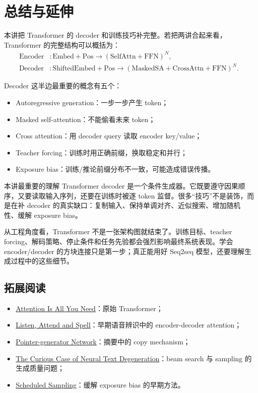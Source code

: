 \documentclass[a4paper]{article}
\begin{document}
\section{总结与延伸}

本讲把 Transformer 的 decoder 和训练技巧补完整。若把两讲合起来看，Transformer 的完整结构可以概括为：
\[
\begin{aligned}
    \text{Encoder}
    &: \mathrm{Embed+Pos}
    \rightarrow
    (\mathrm{SelfAttn+FFN})^{N},\\
    \text{Decoder}
    &: \mathrm{ShiftedEmbed+Pos}
    \rightarrow
    (\mathrm{MaskedSA+CrossAttn+FFN})^{N}.
\end{aligned}
\]

Decoder 这半边最重要的概念有五个：
\begin{itemize}
    \item Autoregressive generation：一步一步产生 token；
    \item Masked self-attention：不能偷看未来 token；
    \item Cross attention：用 decoder query 读取 encoder key/value；
    \item Teacher forcing：训练时用正确前缀，换取稳定和并行；
    \item Exposure bias：训练/推论前缀分布不一致，可能造成错误传播。
\end{itemize}

\begin{importantbox}{本讲最重要的理解}
    Transformer decoder 是一个条件生成器。它既要遵守因果顺序，又要读取输入序列，还要在训练时被逐 token 监督。很多“技巧”不是装饰，而是在补 decoder 的真实缺口：复制输入、保持单调对齐、近似搜索、增加随机性、缓解 exposure bias。
\end{importantbox}

从工程角度看，Transformer 不是一张架构图就结束了。训练目标、teacher forcing、解码策略、停止条件和任务先验都会强烈影响最终系统表现。学会 encoder/decoder 的方块连接只是第一步；真正能用好 Seq2seq 模型，还要理解生成过程中的这些细节。

\subsection{拓展阅读}

\begin{itemize}
    \item \href{https://arxiv.org/abs/1706.03762}{Attention Is All You Need}：原始 Transformer；
    \item \href{https://arxiv.org/abs/1609.08144}{Listen, Attend and Spell}：早期语音辨识中的 encoder-decoder attention；
    \item \href{https://arxiv.org/abs/1704.04368}{Pointer-generator Network}：摘要中的 copy mechanism；
    \item \href{https://arxiv.org/abs/1904.09751}{The Curious Case of Neural Text Degeneration}：beam search 与 sampling 的生成质量问题；
    \item \href{https://arxiv.org/abs/1506.03099}{Scheduled Sampling}：缓解 exposure bias 的早期方法。
\end{itemize}
\end{document}
